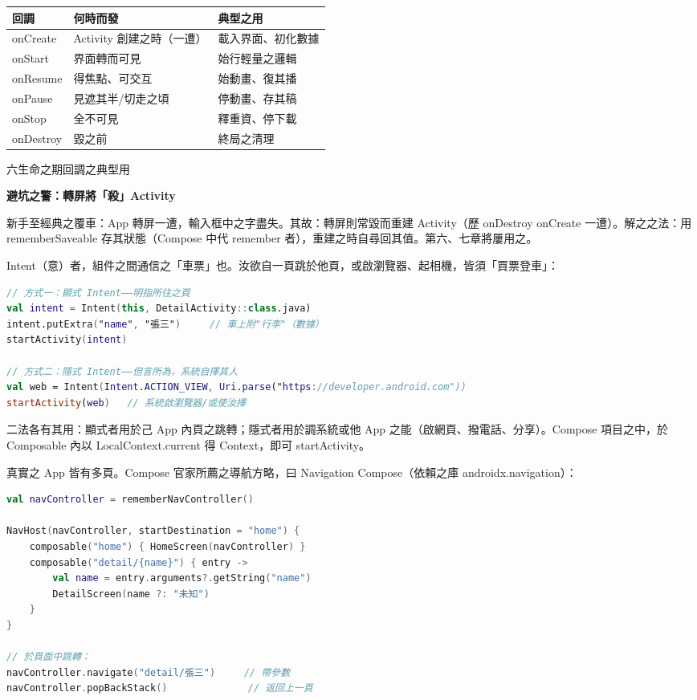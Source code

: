 \begin{center}
\begin{tabularx}{\linewidth}{|X|X|X|}
\hline
\textbf{回調} & \textbf{何時而發} & \textbf{典型之用} \tabularnewline
\hline
onCreate & Activity 創建之時（一遭） & 載入界面、初化數據 \tabularnewline
onStart & 界面轉而可見 & 始行輕量之邏輯 \tabularnewline
onResume & 得焦點、可交互 & 始動畫、復其播 \tabularnewline
onPause & 見遮其半/切走之頃 & 停動畫、存其稿 \tabularnewline
onStop & 全不可見 & 釋重資、停下載 \tabularnewline
onDestroy & 毀之前 & 終局之清理 \tabularnewline
\hline
\end{tabularx}
\end{center}

\begin{center}\small\color{gray}六生命之期回調之典型用\end{center}

\textbf{避坑之警：轉屏將「殺」Activity}\par

新手至經典之覆車：App 轉屏一遭，輸入框中之字盡失。其故：轉屏則常毀而重建 Activity（歷 onDestroy onCreate 一遭）。解之之法：用 rememberSaveable 存其狀態（Compose 中代 remember 者），重建之時自尋回其值。第六、七章將屢用之。


Intent（意）者，組件之間通信之「車票」也。汝欲自一頁跳於他頁，或啟瀏覽器、起相機，皆須「買票登車」：

\begin{lstlisting}[language=Kotlin]
// 方式一：顯式 Intent——明指所往之頁
val intent = Intent(this, DetailActivity::class.java)
intent.putExtra("name", "張三")     // 車上附"行李"（數據）
startActivity(intent)

// 方式二：隱式 Intent——但言所為，系統自擇其人
val web = Intent(Intent.ACTION_VIEW, Uri.parse("https://developer.android.com"))
startActivity(web)   // 系統啟瀏覽器/或使汝擇
\end{lstlisting}

二法各有其用：顯式者用於己 App 內頁之跳轉；隱式者用於調系統或他 App 之能（啟網頁、撥電話、分享）。Compose 項目之中，於 Composable 內以 LocalContext.current 得 Context，即可 startActivity。


真實之 App 皆有多頁。Compose 官家所薦之導航方略，曰 Navigation Compose（依賴之庫 androidx.navigation）：

\begin{lstlisting}[language=Kotlin]
val navController = rememberNavController()

NavHost(navController, startDestination = "home") {
    composable("home") { HomeScreen(navController) }
    composable("detail/{name}") { entry ->
        val name = entry.arguments?.getString("name")
        DetailScreen(name ?: "未知")
    }
}

// 於頁面中跳轉：
navController.navigate("detail/張三")     // 帶參數
navController.popBackStack()              // 返回上一頁
\end{lstlisting}

